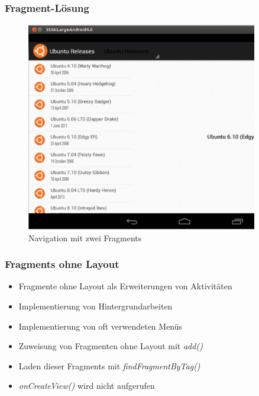 \begin{frame}[label=fragment_layout]
   \frametitle{Fragment-Lösung}
	\begin{figure}[h!]
	  \centering
	  \includegraphics[width=0.9\textwidth]{pictures/ubuntu_list_large.ps}
	  \caption{
		  Navigation mit zwei Fragments
	  }
	  \label{fig:ubuntu_fragment_list}
	\end{figure}
\end{frame}

\begin{frame}[label=fragments_without_layout]
   \frametitle{Fragments ohne Layout}
   \begin{itemize}
      \item Fragmente ohne Layout als Erweiterungen von Aktivitäten
      \item Implementierung von Hintergrundarbeiten
      \item Implementierung von oft verwendeten Menüs
      \item Zuweisung von Fragmenten ohne Layout mit \emph{add()}
      \item Laden dieser Fragments mit \emph{findFragmentByTag()}
      \item \emph{onCreateView()} wird nicht aufgerufen
   \end{itemize}
\end{frame}

